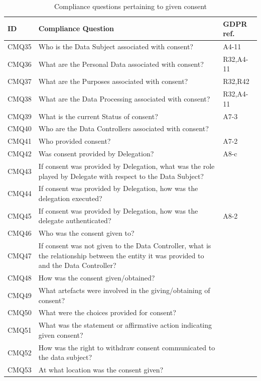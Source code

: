 \begin{table}
\small
\centering
\caption{Compliance questions pertaining to given consent}\label{table:info:compliance-given-consent}
\begin{tabularx}{\textwidth}{|l|X|l|}
\hline
\textbf{ID} & \textbf{Compliance Question} & \textbf{GDPR ref.} \\ \hline
CMQ35 & Who is the Data Subject associated with consent? & A4-11 \\ \hline
CMQ36 & What are the Personal Data associated with consent? & R32,A4-11 \\ \hline
CMQ37 & What are the Purposes associated with consent? & R32,R42 \\ \hline
CMQ38 & What are the Data Processing associated with consent? & R32,A4-11 \\ \hline
CMQ39 & What is the current Status of consent? & A7-3 \\ \hline
CMQ40 & Who are the Data Controllers associated with consent? &  \\ \hline
CMQ41 & Who provided consent? & A7-2 \\ \hline
CMQ42 & Was consent provided by Delegation? & A8-c \\ \hline
CMQ43 & If consent was provided by Delegation, what was the role played by Delegate with respect to the Data Subject? &  \\ \hline
CMQ44 & If consent was provided by Delegation, how was the delegation executed? &  \\ \hline
CMQ45 & If consent was provided by Delegation, how was the delegate authenticated? & A8-2 \\ \hline
CMQ46 & Who was the consent given to? &  \\ \hline
CMQ47 & If consent was not given to the Data Controller, what is the relationship between the entity it was provided to and the Data Controller? &  \\ \hline
CMQ48 & How was the consent given/obtained? &  \\ \hline
CMQ49 & What artefacts were involved in the giving/obtaining of consent? &  \\ \hline
CMQ50 & What were the choices provided for consent? &  \\ \hline
CMQ51 & What was the statement or affirmative action indicating given consent? &  \\ \hline
CMQ52 & How was the right to withdraw consent communicated to the data subject? &  \\ \hline
CMQ53 & At what location was the consent given? &  \\ \hline

\end{tabularx}
\end{table}
